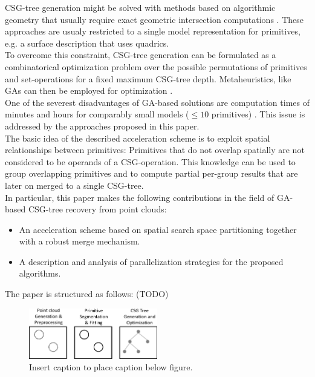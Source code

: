 \ac{CSG}-tree generation might be solved with methods based on algorithmic geometry that usually require exact geometric intersection computations \cite{shapiro1993separation, buchele2004three}. 
These approaches are usualy restricted to a single model representation for primitives, e.g. a surface description that uses quadrics. 
\\  
To overcome this constraint, \ac{CSG}-tree generation can be formulated as a combinatorical optimization problem over the possible permutations of primitives and set-operations for a fixed maximum \ac{CSG}-tree depth.
Metaheuristics, like \acp{GA} can then be employed for optimization \cite{mitchell1998introduction}.
\\
One of the severest disadvantages of \ac{GA}-based solutions are computation times of minutes and hours for comparably small models ($\le 10$ primitives) \cite{fayolle2016evolutionary}.
This issue is addressed by the approaches proposed in this paper.  
\\
The basic idea of the described acceleration scheme is to exploit spatial relationships between primitives: 
Primitives that do not overlap spatially are not considered to be operands of a \ac{CSG}-operation.
This knowledge can be used to group overlapping primitives and to compute partial per-group results that are later on merged to a single \ac{CSG}-tree. 
\\
In particular, this paper makes the following contributions in the field of \ac{GA}-based \ac{CSG}-tree recovery from point clouds: 
\begin{itemize}
\item An acceleration scheme based on spatial search space partitioning together with a robust merge mechanism.
\item A description and analysis of parallelization strategies for the proposed algorithms.
\end{itemize}  
The paper is structured as follows: (TODO)
\copyrightspace
\begin{figure}[htb]
	\centering
	\includegraphics[width=0.5\textwidth]{figures/Praesentation1.pdf}
	\caption{Insert caption to place caption below figure.}
	\label{fig:spp}
\end{figure}

